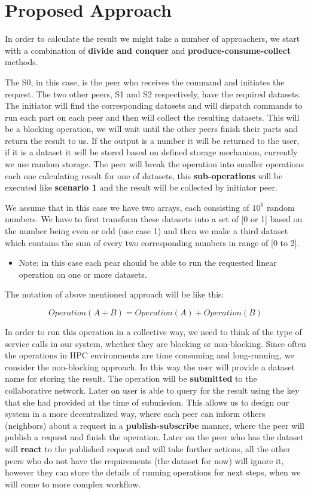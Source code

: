 \section{Proposed Approach}
In order to calculate the result we might take a number of approachers, we start with a combination of \textbf{divide and conquer} and
\textbf{produce-consume-collect} methods.

The S0, in this case, is the peer who receives the command and initiates the request. The two other peers, S1 and S2 respectively, have the required
datasets. The initiator will find the corresponding datasets and will dispatch commands to run each part on each peer and then will collect
the resulting datasets. This will be a blocking operation, we will wait until the other peers finish their parts and return the result
to us. If the output is a number it will be returned to the user, if it is a dataset it will be stored based on defined storage mechanism, 
currently we use random storage. The peer will break the operation into smaller operations each one calculating result for one of datasets, 
this \textbf{sub-operations} will be executed like \textbf{scenario 1} and the result will be collected by initiator peer.

We assume that in this case we have two arrays, each consisting of \(10^6\) random numbers. We have to first transform these datasets into
a set of [0 or 1] based on the number being even or odd (use case 1) and then we make a third dataset which contains the sum of every two
corresponding numbers in range of [0 to 2].


\begin{itemize}
\item Note: in this case each pear should be able to run the requested linear operation on one or more datasets.
\end{itemize}

The notation of above mentioned approach will be like this:

\[ Operation(A + B) = Operation(A) + Operation(B) \]

In order to run this operation in a collective way, we need to think of the type of service calls in our system, whether they are blocking or
non-blocking. Since often the operations in HPC environments are time consuming and long-running, we consider the non-blocking approach. In
this way the user will provide a dataset name for storing the result. The operation will be \textbf{submitted} to the collaborative network.
Later on user is able to query for the result using the key that she had provided at the time of submission. This allows us to design our system
in a more decentralized way, where each peer can inform others (neighbors) about a request in a \textbf{publish-subscribe} manner, where the peer
will publish a request and finish the operation. Later on the peer who has the dataset will \textbf{react} to the published request and will take
further actions, all the other peers who do not have the requirements (the dataset for now) will ignore it, however they can store the details of 
running operations for next steps, when we will come to more complex workflow.

